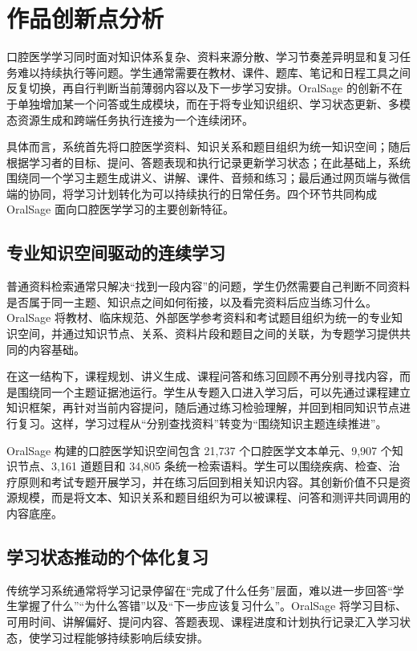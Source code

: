 
\chapter{作品创新点分析}
\label{sec:innovation}

口腔医学学习同时面对知识体系复杂、资料来源分散、学习节奏差异明显和复习任务难以持续执行等问题。学生通常需要在教材、课件、题库、笔记和日程工具之间反复切换，再自行判断当前薄弱内容以及下一步学习安排。OralSage 的创新不在于单独增加某一个问答或生成模块，而在于将专业知识组织、学习状态更新、多模态资源生成和跨端任务执行连接为一个连续闭环。

具体而言，系统首先将口腔医学资料、知识关系和题目组织为统一知识空间；随后根据学习者的目标、提问、答题表现和执行记录更新学习状态；在此基础上，系统围绕同一个学习主题生成讲义、讲解、课件、音频和练习；最后通过网页端与微信端的协同，将学习计划转化为可以持续执行的日常任务。四个环节共同构成 OralSage 面向口腔医学学习的主要创新特征。

\section{专业知识空间驱动的连续学习}

普通资料检索通常只解决“找到一段内容”的问题，学生仍然需要自己判断不同资料是否属于同一主题、知识点之间如何衔接，以及看完资料后应当练习什么。OralSage 将教材、临床规范、外部医学参考资料和考试题目组织为统一的专业知识空间，并通过知识节点、关系、资料片段和题目之间的关联，为专题学习提供共同的内容基础。

在这一结构下，课程规划、讲义生成、课程问答和练习回顾不再分别寻找内容，而是围绕同一个主题证据池运行。学生从专题入口进入学习后，可以先通过课程建立知识框架，再针对当前内容提问，随后通过练习检验理解，并回到相同知识节点进行复习。这样，学习过程从“分别查找资料”转变为“围绕知识主题连续推进”。

OralSage 构建的口腔医学知识空间包含 21,737 个口腔医学文本单元、9,907 个知识节点、3,161 道题目和 34,805 条统一检索语料。学生可以围绕疾病、检查、治疗原则和考试专题开展学习，并在练习后回到相关知识内容。其创新价值不只是资源规模，而是将文本、知识关系和题目组织为可以被课程、问答和测评共同调用的内容底座。

\section{学习状态推动的个体化复习}

传统学习系统通常将学习记录停留在“完成了什么任务”层面，难以进一步回答“学生掌握了什么”“为什么答错”以及“下一步应该复习什么”。OralSage 将学习目标、可用时间、讲解偏好、提问内容、答题表现、课程进度和计划执行记录汇入学习状态，使学习过程能够持续影响后续安排。

